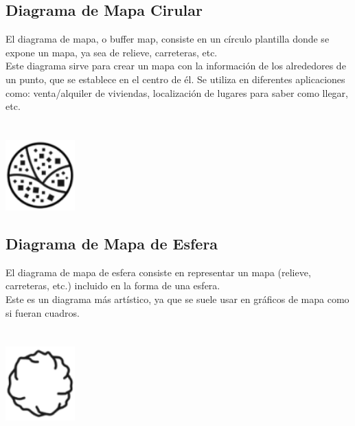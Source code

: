 \documentclass{article}\usepackage[]{graphicx}\usepackage[]{color}
\begin{document}
\subsection{Diagrama de Mapa Cirular}
El diagrama de mapa, o buffer map, consiste en un c\'irculo plantilla donde se expone un mapa, ya sea de relieve, carreteras, etc.~\\
Este diagrama sirve para crear un mapa con la informaci\'on de los alrededores de un punto, que se establece en el centro de \'el.
Se utiliza en diferentes aplicaciones como: venta/alquiler de viviendas, localizaci\'on de lugares para saber como llegar, etc.
~\\~\\~\\
\vbox{
    \centering
    \includegraphics[width=0.2\textwidth]{imag/carreteras}
}
\subsection{Diagrama de Mapa de Esfera}
El diagrama de mapa de esfera consiste en representar un mapa (relieve, carreteras, etc.) incluido en la forma de una esfera.~\\
Este es un diagrama m\'as art\'istico, ya que se suele usar en gr\'aficos de mapa como si fueran cuadros.
~\\~\\~\\
\vbox{
    \centering
    \includegraphics[width=0.2\textwidth]{imag/esferas}
}
\clearpage
\end{document}
